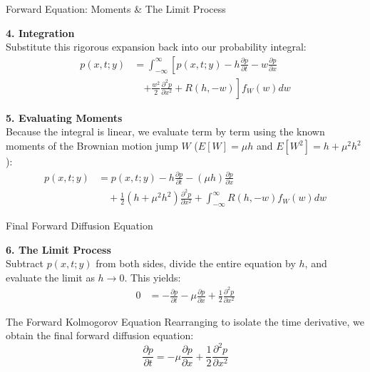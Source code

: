 \documentclass{beamer}
\begin{document}
\begin{frame}{Forward Equation: Moments \& The Limit Process}


\vspace{0.3cm}
\textbf{4. Integration} \\
Substitute this rigorous expansion back into our probability integral: %
\begin{align*}
p(x,t;y) &= \int_{-\infty}^\infty \left[ p(x,t;y) - h\frac{\partial p}{\partial t} - w\frac{\partial p}{\partial x} \right. \\
&\quad \left. + \frac{w^2}{2}\frac{\partial^2 p}{\partial x^2} + R(h, -w) \right] f_W(w)dw
\end{align*} %

\textbf{5. Evaluating Moments} \\
Because the integral is linear, we evaluate term by term using the known moments of the Brownian motion jump $W$ ($E[W] = \mu h$ and $E[W^2] = h + \mu^2 h^2$): %
\begin{align*}
p(x,t;y) &= p(x,t;y) - h\frac{\partial p}{\partial t} - (\mu h)\frac{\partial p}{\partial x} \\
&\quad + \frac{1}{2}(h + \mu^2 h^2)\frac{\partial^2 p}{\partial x^2} + \int_{-\infty}^\infty R(h, -w)f_W(w)dw
\end{align*} %
\end{frame}
\begin{frame}{Final Forward Diffusion Equation}

\textbf{6. The Limit Process} \\
Subtract $p(x, t; y)$ from both sides, divide the entire equation by $h$, and evaluate the limit as $h \to 0$. This yields:
\begin{align*}
0 &= -\frac{\partial p}{\partial t} - \mu\frac{\partial p}{\partial x} + \frac{1}{2}\frac{\partial^2 p}{\partial x^2}
\end{align*}

\vspace{0.4cm}

\begin{block}{The Forward Kolmogorov Equation}
Rearranging to isolate the time derivative, we obtain the final forward diffusion equation:
\[
\boxed{
\frac{\partial p}{\partial t} = -\mu\frac{\partial p}{\partial x} + \frac{1}{2}\frac{\partial^2 p}{\partial x^2}
}
\]
\end{block}

\end{frame}
\end{document}
